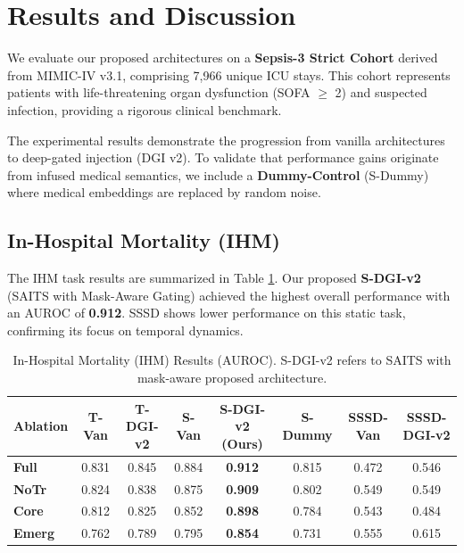 \section{Results and Discussion}
\label{sec:results}

We evaluate our proposed architectures on a \textbf{Sepsis-3 Strict Cohort} derived from MIMIC-IV v3.1, comprising 7,966 unique ICU stays. This cohort represents patients with life-threatening organ dysfunction (SOFA $\ge$ 2) and suspected infection, providing a rigorous clinical benchmark.

The experimental results demonstrate the progression from vanilla architectures to deep-gated injection (DGI v2). To validate that performance gains originate from infused medical semantics, we include a \textbf{Dummy-Control} (S-Dummy) where medical embeddings are replaced by random noise.

\subsection{In-Hospital Mortality (IHM)}
The IHM task results are summarized in Table \ref{tab:ihm_complete}. Our proposed \textbf{S-DGI-v2} (SAITS with Mask-Aware Gating) achieved the highest overall performance with an AUROC of \textbf{0.912}. SSSD shows lower performance on this static task, confirming its focus on temporal dynamics.

\begin{table}[t]
\centering
\caption{In-Hospital Mortality (IHM) Results (AUROC). S-DGI-v2 refers to SAITS with mask-aware proposed architecture.}
\label{tab:ihm_complete}
\begin{tabular}{lccccccc}
\toprule
\textbf{Ablation} & \textbf{T-Van} & \textbf{T-DGI-v2} & \textbf{S-Van} & \textbf{S-DGI-v2 (Ours)} & \textbf{S-Dummy} & \textbf{SSSD-Van} & \textbf{SSSD-DGI-v2} \\
\midrule
\textbf{Full}  & 0.831 & 0.845 & 0.884 & \textbf{0.912} & 0.815 & 0.472 & 0.546 \\
\textbf{NoTr}  & 0.824 & 0.838 & 0.875 & \textbf{0.909} & 0.802 & 0.549 & 0.549 \\
\textbf{Core}  & 0.812 & 0.825 & 0.852 & \textbf{0.898} & 0.784 & 0.543 & 0.484 \\
\textbf{Emerg} & 0.762 & 0.789 & 0.795 & \textbf{0.854} & 0.731 & 0.555 & 0.615 \\
\bottomrule
\end{tabular}
\end{table}

